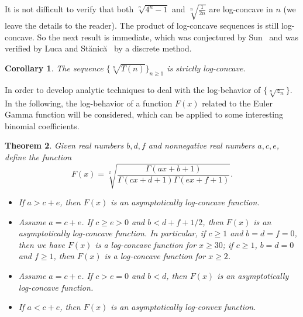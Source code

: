 \documentclass[12pt,reqno]{article}
\newtheorem{thm}{Theorem}[section]
\newtheorem{cor}[thm]{Corollary}
\theoremstyle{definition}
\numberwithin{equation}{section}
\begin{document}
It is not difficult to verify that both $\sqrt[n]{4^{n}-1}$ and
$\sqrt[n]{\frac{1}{2n}}$ are log-concave in $n$ (we leave the
details to the reader). The product of log-concave sequences is
still log-concave. So the next result is immediate, which was
conjectured by Sun~\cite[Conjecture 3.5]{Sun-conj} and was verified
by Luca and St\u{a}nic\u{a}~\cite{LS12} by a discrete method.
\begin{cor}
The sequence $\{\sqrt[n]{T(n)}\}_{n\ge 1}$ is strictly log-concave.
\end{cor}
In order to develop analytic techniques to deal with the
log-behavior of $\{\sqrt[n]{z_n}\}$. In the following, the
log-behavior of a function $F(x)$ related to the Euler Gamma
function will be considered, which can be applied to some
interesting binomial coefficients.
\begin{thm}\label{thm+sum}
Given real numbers $b,d,f$ and nonnegative real numbers $a,c,e$,
define the function
$$F(x)=\sqrt[x]{\frac{\Gamma(ax+b+1)}{\Gamma(c x+d+1)\Gamma(e x+f+1)}}.$$
\begin{itemize}
\item [\rm(i)]
If $a> c+e$, then $F(x)$ is an asymptotically log-concave function.
\item [\rm(ii)] Assume $a= c+e$. If $c\ge e>0$ and $b< d+f+1/2$, then $F(x)$ is an
asymptotically log-concave function.  In particular, if $c\ge 1$ and
$b=d=f=0$, then we have $F(x)$ is a log-concave function for $x\geq
30$; if $c\ge 1$, $b=d=0$ and $f\geq1$, then $F(x)$ is a log-concave
function for $x\geq 2$.
\item [\rm(iii)] Assume $a= c+e$. If $c> e=0$ and $b< d$, then $F(x)$ is an
asymptotically log-concave function.
\item [\rm(iv)]
If $a<c+e$, then $F(x)$ is an asymptotically log-convex function.
\end{itemize}
\end{thm}
\end{document}
